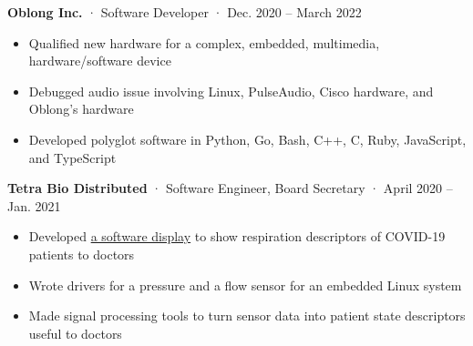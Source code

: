 \documentclass[12pt, oneside]{article}
\newcommand{\jobtitle}[3] {
	{\bf #1} · {#2} · {#3} \vspace{-7pt} \\
}
\begin{document}
\begin{flushleft}
\jobtitle{Oblong Inc.}{Software Developer}{Dec. 2020 – March 2022}
\begin{itemize}
	\item Qualified new hardware for a complex, embedded, multimedia, hardware/software device \\
	\item Debugged audio issue involving Linux, PulseAudio, Cisco hardware, and Oblong's hardware \\
	\item Developed polyglot software in Python, Go, Bash, C++, C, Ruby, JavaScript, and TypeScript \\
\end{itemize}

\jobtitle{Tetra Bio Distributed}{Software Engineer, Board Secretary}{April 2020 – Jan. 2021}
\begin{itemize}
	\item Developed \href{https://github.com/tetrabiodistributed/project-tetra-display}{a software display} to show respiration descriptors of COVID-19 patients to doctors \\
	\item Wrote drivers for a pressure and a flow sensor for an embedded Linux system \\
	\item Made signal processing tools to turn sensor data into patient state descriptors useful to doctors \\
\end{itemize}


\end{flushleft}
\end{document}
